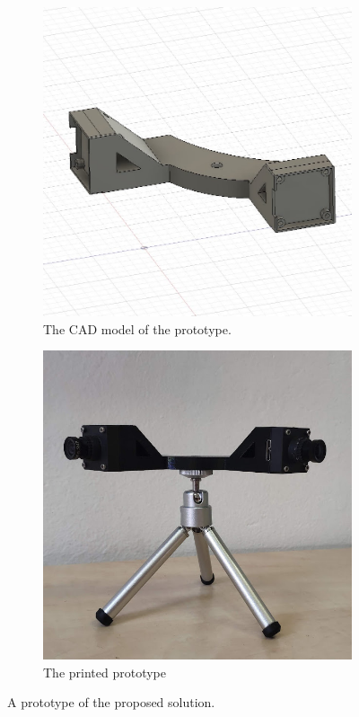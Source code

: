 \begin{figure}[ht]
  \begin{subfigure}[b]{0.49\textwidth}
    \centering
    \includegraphics[width=\textwidth]{graphics/CAD.jpg}
    \caption{The CAD model of the prototype.}
    \label{fig:proto_scheme}
  \end{subfigure}
  \hfill
  \begin{subfigure}[b]{0.49\textwidth}
    \centering
    \includegraphics[width=\textwidth]{graphics/prototype.jpg}
    \caption{The printed prototype}
    \label{fig:proto_printed}
  \end{subfigure}
  \caption{A prototype of the proposed solution.}
  \label{fig:prototype}
\end{figure}

